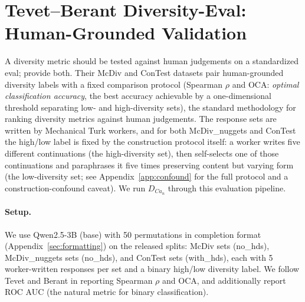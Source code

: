 \section{Tevet--Berant Diversity-Eval: Human-Grounded Validation}\label{sec:tevet}

A diversity metric should be tested against human judgements on a standardized eval; \citet{tevet2020evaluating} provide both.
Their McDiv and ConTest datasets pair human-grounded diversity labels with a fixed comparison protocol (Spearman $\rho$ and OCA: \emph{optimal classification accuracy}, the best accuracy achievable by a one-dimensional threshold separating low- and high-diversity sets), the standard methodology for ranking diversity metrics against human judgements.
The response sets are written by Mechanical Turk workers, and for both McDiv\_nuggets and ConTest the high/low label is fixed by the construction protocol itself: a worker writes five different continuations (the high-diversity set), then self-selects one of those continuations and paraphrases it five times preserving content but varying form (the low-diversity set; see Appendix~\ref{app:confound} for the full protocol and a construction-confound caveat).
We run $D_{Ca_n}$ through this evaluation pipeline.

\paragraph{Setup.} We use Qwen2.5-3B (base) with 50 permutations in completion format (Appendix~\ref{sec:formatting}) on the released splits: \tevetMcDivSetCount{} McDiv sets (no\_hds), \tevetMcDivNugSetCount{} McDiv\_nuggets sets (no\_hds), and \tevetConTestSetCount{} ConTest sets (with\_hds), each with 5 worker-written responses per set and a binary high/low diversity label.
We follow Tevet and Berant in reporting Spearman $\rho$ and OCA, and additionally report ROC AUC (the natural metric for binary classification).

\begin{table}[t]
\centering
\caption{ConTest results: Spearman $\rho$ and OCA between a set's diversity class and each metric score.
Baselines from Tevet's pre-computed metrics; $C \!\times\! a_n$ and $a_n$ are ours (Qwen2.5-3B, 50 permutations, per-byte).
Best result per task in bold.}
\label{tab:contest}
\small

\end{table}


